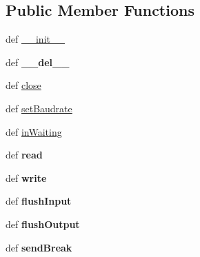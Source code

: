 \subsection*{Public Member Functions}
\begin{DoxyCompactItemize}
\item 
def \hyperlink{classserial_1_1serialwin32_1_1_serial_a496d79e84b2e54cb421e29fe0aded074}{\-\_\-\-\_\-init\-\_\-\-\_\-}
\item 
\hypertarget{classserial_1_1serialwin32_1_1_serial_a3a261255c5077d9d36fc7f01321117fe}{def {\bfseries \-\_\-\-\_\-del\-\_\-\-\_\-}}\label{classserial_1_1serialwin32_1_1_serial_a3a261255c5077d9d36fc7f01321117fe}

\item 
def \hyperlink{classserial_1_1serialwin32_1_1_serial_a84c8d26d8bc4c900279841a439a36e9a}{close}
\item 
def \hyperlink{classserial_1_1serialwin32_1_1_serial_a27ba1ff7129d10686e81e6091f9f3cca}{set\-Baudrate}
\item 
def \hyperlink{classserial_1_1serialwin32_1_1_serial_a218b909b445cf9e68aaf5e58c649dd77}{in\-Waiting}
\item 
\hypertarget{classserial_1_1serialwin32_1_1_serial_ac4a825bf4ca093c2dd3f9cb492b1f8b6}{def {\bfseries read}}\label{classserial_1_1serialwin32_1_1_serial_ac4a825bf4ca093c2dd3f9cb492b1f8b6}

\item 
\hypertarget{classserial_1_1serialwin32_1_1_serial_acc20ff5a06c1a7d719c65146068a0526}{def {\bfseries write}}\label{classserial_1_1serialwin32_1_1_serial_acc20ff5a06c1a7d719c65146068a0526}

\item 
\hypertarget{classserial_1_1serialwin32_1_1_serial_a99d1d815de2b6f078e0d010992ee3b10}{def {\bfseries flush\-Input}}\label{classserial_1_1serialwin32_1_1_serial_a99d1d815de2b6f078e0d010992ee3b10}

\item 
\hypertarget{classserial_1_1serialwin32_1_1_serial_a78c782edbc022d76370490f7b2d94508}{def {\bfseries flush\-Output}}\label{classserial_1_1serialwin32_1_1_serial_a78c782edbc022d76370490f7b2d94508}

\item 
\hypertarget{classserial_1_1serialwin32_1_1_serial_a8bc06dd407e906f96685c341830993c7}{def {\bfseries send\-Break}}\label{classserial_1_1serialwin32_1_1_serial_a8bc06dd407e906f96685c341830993c7}


\end{DoxyCompactItemize}
